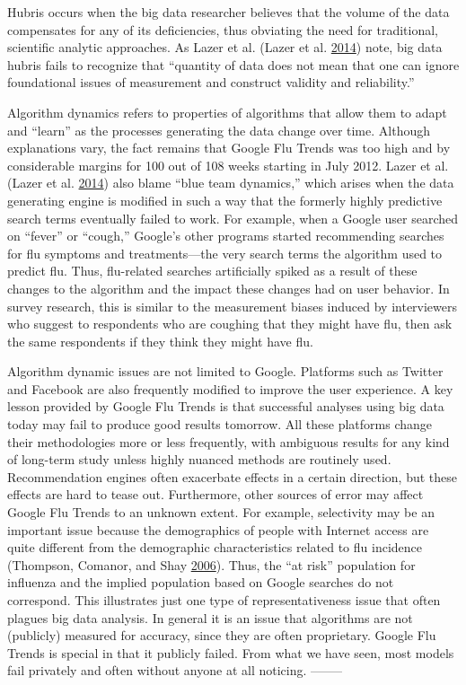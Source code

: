 \documentclass[]{krantz}
\begin{document}
Hubris occurs when the big data researcher believes that the volume of
the data compensates for any of its deficiencies, thus obviating the
need for traditional, scientific analytic approaches. As Lazer et al.
(Lazer et al. \protect\hyperlink{ref-lazer2014parable}{2014}) note, big
data hubris fails to recognize that ``quantity of data does not mean
that one can ignore foundational issues of measurement and construct
validity and reliability.''

Algorithm dynamics refers to properties of algorithms that allow them to
adapt and ``learn'' as the processes generating the data change over
time. Although explanations vary, the fact remains that Google Flu
Trends was too high and by considerable margins for 100 out of 108 weeks
starting in July 2012. Lazer et al. (Lazer et al.
\protect\hyperlink{ref-lazer2014parable}{2014}) also blame ``blue team
dynamics,'' which arises when the data generating engine is modified in
such a way that the formerly highly predictive search terms eventually
failed to work. For example, when a Google user searched on ``fever'' or
``cough,'' Google's other programs started recommending searches for flu
symptoms and treatments---the very search terms the algorithm used to
predict flu. Thus, flu-related searches artificially spiked as a result
of these changes to the algorithm and the impact these changes had on
user behavior. In survey research, this is similar to the measurement
biases induced by interviewers who suggest to respondents who are
coughing that they might have flu, then ask the same respondents if they
think they might have flu.

Algorithm dynamic issues are not limited to Google. Platforms such as
Twitter and Facebook are also frequently modified to improve the user
experience. A key lesson provided by Google Flu Trends is that
successful analyses using big data today may fail to produce good
results tomorrow. All these platforms change their methodologies more or
less frequently, with ambiguous results for any kind of long-term study
unless highly nuanced methods are routinely used. Recommendation engines
often exacerbate effects in a certain direction, but these effects are
hard to tease out. Furthermore, other sources of error may affect Google
Flu Trends to an unknown extent. For example, selectivity may be an
important issue because the demographics of people with Internet access
are quite different from the demographic characteristics related to flu
incidence (Thompson, Comanor, and Shay
\protect\hyperlink{ref-thompson2006epidemiology}{2006}). Thus, the ``at
risk'' population for influenza and the implied population based on
Google searches do not correspond. This illustrates just one type of
representativeness issue that often plagues big data analysis. In
general it is an issue that algorithms are not (publicly) measured for
accuracy, since they are often proprietary. Google Flu Trends is special
in that it publicly failed. From what we have seen, most models fail
privately and often without anyone at all noticing. --------
\end{document}
